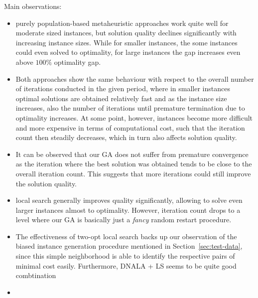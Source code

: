 \documentclass[12pt]{article}
\begin{document}
Main observations:
\begin{itemize}
	\item purely population-based metaheuristic approaches work quite well for moderate sized instances, but solution quality declines significantly with increasing instance sizes. While for smaller instances, the some instances could even solved to optimality, for large instances the gap increases even above $100\%$ optimality gap. 
	\item Both approaches show the same behaviour with respect to the overall number of iterations conducted in the given period, where in smaller instances optimal solutions are obtained relatively fast and as the instance size increases, also the number of iterations until premature termination due to optimality increases. At some point, however, instances become more difficult and more expensive in terms of computational cost, such that the iteration count then steadily decreases, which in turn also affects solution quality. 
	\item It can be observed that our GA does not suffer from premature convergence as the iteration where the best solution was obtained tends to be close to the overall iteration count. This suggests that more iterations could still improve the solution quality. 
	\item local search generally improves quality significantly, allowing to solve even larger instances almost to optimality. However, iteration count drops to a level where our GA is basically just a \emph{fancy} random restart procedure. 
	\item The effectiveness of two-opt local search	backs up our observation of the biased instance generation procedure mentioned in Section~\ref{sec:test-data}, since this simple neighborhood is able to identify the respective pairs of minimal cost easily. Furthermore, DNALA + LS seems to be quite good combtination 
	\item 
\end{itemize}
\end{document}
